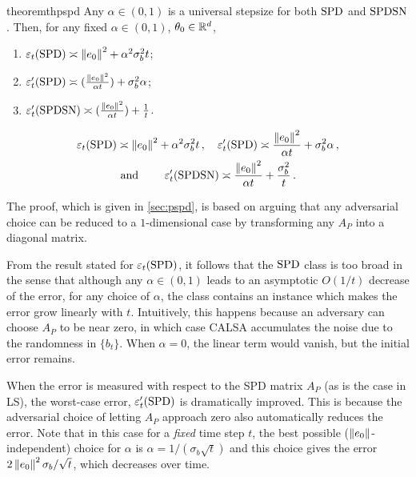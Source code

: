 \begin{restatable}{theorem}{thpspd}\label{th:pspd}
Any $\alpha\in(0,1)$ is a universal stepsize for
both $\mathrm{SPD}$ and $\mathrm{SPDSN}$.
Then, for any fixed $\alpha\in (0,1)$, $\theta_0\in \mathbb{R}^d$,
\begin{enumerate}[label=(\emph{\roman*}),
topsep=0pt,itemsep=1pt,wide, labelwidth=!, labelindent=0pt]
\item $\varepsilon_t(\mathrm{SPD}) \asymp
\left\| e_0\right\|^2+\alpha^2\sigma_b^2 t$;
\item $\varepsilon_t'(\mathrm{SPD}) \asymp (\frac{\left\| e_0\right\|^2}{\alpha t})+\sigma^2_b\alpha$;
\item $\varepsilon_t'(\mathrm{SPDSN}) \asymp (\frac{\left\| e_0\right\|^2}{\alpha t})+\frac{1}{t}$.
\end{enumerate}
\fi
\begin{align*}
\varepsilon_t(\mathrm{SPD}) &\asymp \left\| e_0\right\|^2+\alpha^2\sigma_b^2 t\,,\quad
\varepsilon_t'(\mathrm{SPD}) \asymp \frac{\left\| e_0\right\|^2}{\alpha t}+\sigma^2_b\alpha\,,\\
&\text{ and }\qquad \varepsilon_t'(\mathrm{SPDSN}) \asymp \frac{\left\| e_0\right\|^2}{\alpha t}+\frac{\sigma_b^2}{t}\,.
\end{align*}
\end{restatable}
The proof, which is given in \cref{sec:pspd}, is based on arguing that any adversarial choice can be reduced to a $1$-dimensional case by transforming any $A_P$ into a diagonal matrix.

From the result stated for $\varepsilon_t(\mathrm{SPD})$,
it follows that the $\mathrm{SPD}$ class is too broad in the sense that although any $\alpha\in (0,1)$ leads to an asymptotic $O(1/t)$ decrease of the error, for any choice of $\alpha$, the class contains an instance which makes the error grow linearly with $t$. Intuitively, this happens because an adversary can choose $A_P$ to be near zero, in which case CALSA accumulates the noise due to the randomness in $\{b_t\}$. When $\alpha=0$, the linear term would vanish, but the initial error remains. 

When the error is measured with respect to the SPD matrix $A_P$ (as is the case in LS), the worst-case error, $\varepsilon_t'(\mathrm{SPD})$ is dramatically improved. This is because the adversarial choice of letting $A_P$ approach zero also
automatically reduces the error. Note that in this case for a \emph{fixed} time step $t$, the best possible ($\left\| e_0\right\|$-independent)
choice for $\alpha$ is $\alpha = 1/(\sigma_b \sqrt{t})$ and this choice 
gives the error $2\left\| e_0\right\|^2 \sigma_b/\sqrt{t}$, which decreases over time.

